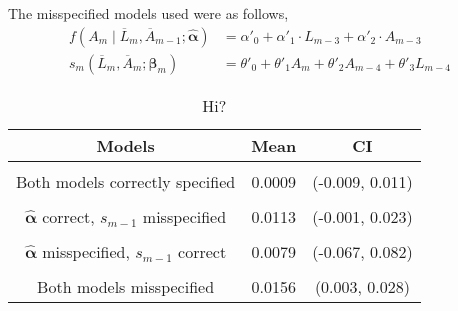 The misspecified models used were as follows, 
\begin{align} 
f(A_m \mid \overline{L}_m, \overline{A}_{m-1}; \hat{\mathbf{\alpha}}) &= \alpha'_{0} + \alpha'_{1} \cdot L_{m-3} + \alpha'_{2} \cdot A_{m-3} \\ 
s_{m}(\overline{L}_{m}, \overline{A}_{m};\mathbf{\beta}_{m}) &= \theta'_0 + \theta'_1 A_{m} +\theta'_2 A_{m-4} + \theta'_3 L_{m-4} 
 \end{align} 

\begin{table}[h!]
\centering
\begin{tabular} {c | c  c}
Models & Mean & CI \\ 
\hline  \\
Both models correctly specified & 0.0009 & (-0.009, 0.011)\\ \\
$\hat{\mathbf{\alpha}}$ correct, $s_{m-1}$ misspecified & 0.0113 & (-0.001, 0.023)\\ \\
$\hat{\mathbf{\alpha}}$ misspecified, $s_{m-1}$ correct & 0.0079 & (-0.067, 0.082) \\ \\
Both models misspecified & 0.0156 & (0.003, 0.028) 
\end{tabular} \\
\centering
\caption{Hi?}
\end{table}
